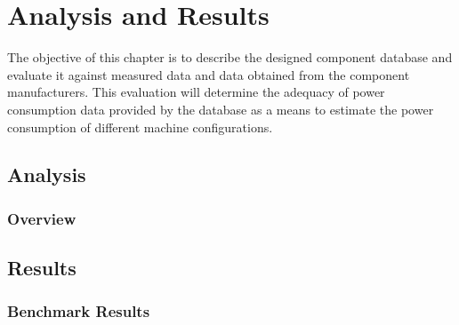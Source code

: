 

\chapter{Analysis and Results} \label{chap4:analysis_results}
%
    The objective of this chapter is to describe the designed component database and evaluate it against measured data and data obtained from the component manufacturers. This evaluation will determine the adequacy of power consumption data provided by the database as a means to estimate the power consumption of different machine configurations.
\section{Analysis} \label{sec4:analysis}

\subsection{Overview} \label{sec4:analysis_overview}

    




\section{Results} \label{sec4:results}
\subsection{Benchmark Results} \label{sec4:benchmark_results}

